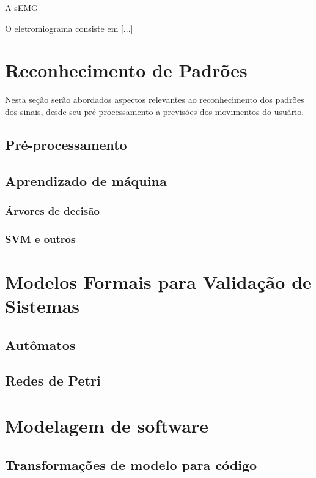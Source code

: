 A sEMG 

O eletromiograma consiste em [...]


\section{Reconhecimento de Padrões}
\label{patternrec}
Nesta seção serão abordados aspectos relevantes ao reconhecimento dos padrões dos sinais, desde seu pré-processamento a previsões dos movimentos do usuário.
\subsection{Pré-processamento}
\subsection{Aprendizado de máquina}
\subsubsection{Árvores de decisão}
\subsubsection{SVM e outros}


\section{Modelos Formais para Validação de Sistemas}
\label{sec:modelosformais}
\subsection{Autômatos}
\subsection{Redes de Petri}

\section{Modelagem de software}
\label{sec:modelagem}
\subsection{Transformações de modelo para código}